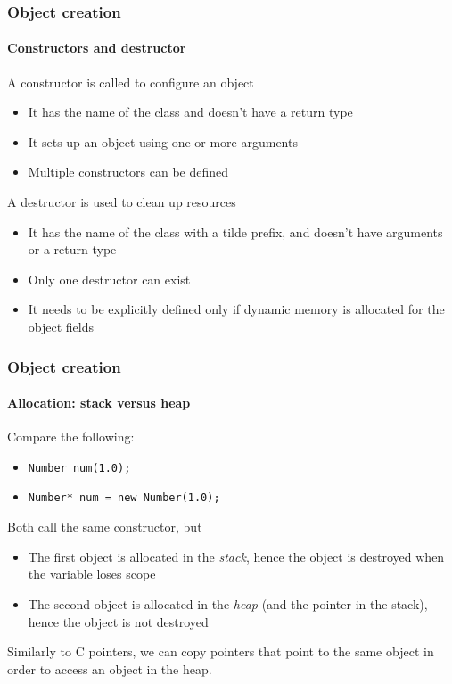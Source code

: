 \begin{frame}
\frametitle{Object creation}
\framesubtitle{Constructors and destructor}

\begin{block}{A constructor is called to configure an object}
\begin{itemize}
\item It has the name of the class and doesn't have a return type
\item It sets up an object using one or more arguments
\item Multiple constructors can be defined
\end{itemize}
\end{block}
\pause
\begin{block}{A destructor is used to clean up resources}
\begin{itemize}
\item It has the name of the class with a tilde prefix, and doesn't have arguments or a return type
\item Only one destructor can exist
\item It needs to be explicitly defined only if dynamic memory is allocated for the object fields
\end{itemize}
\end{block}

\end{frame}

\begin{frame}
\frametitle{Object creation}
\framesubtitle{Allocation: stack versus heap}

\begin{block}{Compare the following:}
\begin{itemize}
\item \texttt{Number num(1.0); }
\item \texttt{Number* num = new Number(1.0); }
\end{itemize}
Both call the same constructor, but
\begin{itemize}
\item The first object is allocated in the {\em stack}, hence the object is destroyed when the variable loses scope
\item The second object is allocated in the {\em heap} (and the pointer in the stack), hence the object is not destroyed
\end{itemize}
Similarly to C pointers, we can copy pointers that point to the same object in order to access an object in the heap.
\end{block}

\end{frame}


